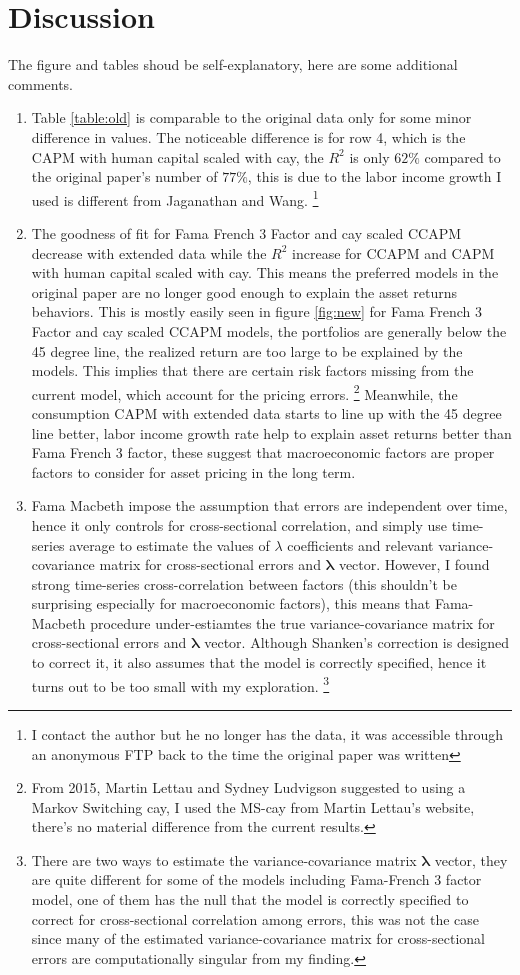 \documentclass[12pt]{article}
\begin{document}
\section{Discussion}
The figure and tables shoud be self-explanatory, here are some additional comments.
\begin{enumerate}
 \item Table \ref{table:old} is comparable to the original data only for some minor difference in values. The noticeable difference is for row 4, which is the CAPM with human capital scaled with cay, the $R^2$ is only $62\%$ compared to the original paper's number of $77\%$, this is due to the labor income growth I used is different from Jaganathan and Wang. \footnote{I contact the author but he no longer has the data, it was accessible through an anonymous FTP back to the time the original paper was written }
 \item  The goodness of fit for Fama French 3 Factor and cay scaled CCAPM decrease with extended data while the $R^2$ increase for CCAPM and CAPM with human capital scaled with cay. This means the preferred models in the original paper are no longer good enough to explain the asset returns behaviors. This is mostly easily seen in figure \ref{fig:new} for Fama French 3 Factor and cay scaled CCAPM models, the portfolios are generally below the 45 degree line, the realized return are too large to be explained by the models. This implies that there are certain risk factors missing from the current model, which account for the pricing errors. \footnote{From 2015, Martin Lettau and Sydney Ludvigson suggested to using a Markov Switching cay, I used the MS-cay from Martin Lettau's website, there's no material difference from the current results.}
 Meanwhile, the consumption CAPM with extended data starts to line up with the 45 degree line better, labor income growth rate help to explain asset returns better than Fama French 3 factor, these suggest that macroeconomic factors are proper factors to consider for asset pricing in the long term.
 \item Fama Macbeth impose the assumption that errors are independent over time, hence it only controls for cross-sectional correlation, and simply use time-series average to estimate the values of $\lambda$ coefficients and relevant variance-covariance matrix for cross-sectional errors and $\bm{\lambda}$ vector. However, I found strong time-series cross-correlation between factors (this shouldn't be surprising especially for macroeconomic factors), this means that Fama-Macbeth procedure under-estiamtes the true variance-covariance matrix for cross-sectional errors and $\bm{\lambda}$ vector. Although Shanken's correction is designed to correct it, it also assumes that the model is correctly specified, hence it turns out to be too small with my exploration. \footnote{There are two ways to estimate the variance-covariance matrix $\bm{\lambda}$ vector, they are quite different for some of the models including Fama-French 3 factor model, one of them has the null that the model is correctly specified to correct for cross-sectional correlation among errors, this was not the case since many of the estimated variance-covariance matrix for cross-sectional errors are computationally singular from my finding.}

\end{enumerate}
\end{document}
